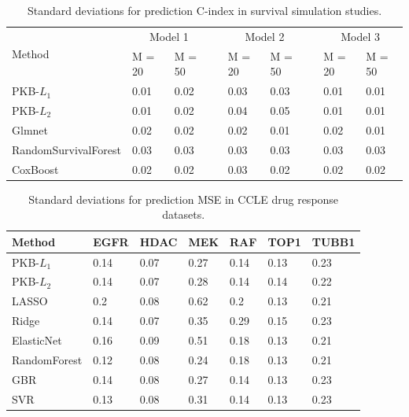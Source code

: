 \documentclass[a4paper,12pt]{article}
\begin{document}
\begin{table}[htp]
	\centering
	\begin{tabular}{lllllllll}
		\hline
		\multirow{2}{*}{Method} & \multicolumn{2}{c}{Model 1} & \multicolumn{1}{c}{} & \multicolumn{2}{c}{Model 2} & \multicolumn{1}{c}{} & \multicolumn{2}{c}{Model 3} \\ \cline{2-3} \cline{5-6} \cline{8-9} 
		& M = 20       & M = 50       &                      & M = 20       & M = 50       &                      & M = 20       & M = 50       \\ \hline
		PKB-$L_1$                  & 0.01         & 0.02         &                      & 0.03         & 0.03         &                      & 0.01         & 0.01         \\
		PKB-$L_2$                  & 0.01         & 0.02         &                      & 0.04         & 0.05         &                      & 0.01         & 0.01         \\
		Glmnet                  & 0.02         & 0.02         &                      & 0.02         & 0.01         &                      & 0.02         & 0.01         \\
		RandomSurvivalForest    & 0.03         & 0.03         &                      & 0.03         & 0.03         &                      & 0.03         & 0.03         \\
		CoxBoost                & 0.02         & 0.02         &                      & 0.03         & 0.02         &                      & 0.02         & 0.02         \\ \hline
	\end{tabular}
	\caption{Standard deviations for prediction C-index in survival simulation studies.}
\end{table}

\newpage

\begin{table}[htp]
	\centering
	\begin{tabular}{lllllll}
		\hline
		Method       & EGFR & HDAC & MEK  & RAF  & TOP1 & TUBB1 \\ \hline
		PKB-$L_1$       & 0.14 & 0.07 & 0.27 & 0.14 & 0.13 & 0.23  \\
		PKB-$L_2$       & 0.14 & 0.07 & 0.28 & 0.14 & 0.14 & 0.22  \\
		LASSO        & 0.2  & 0.08 & 0.62 & 0.2  & 0.13 & 0.21  \\
		Ridge        & 0.14 & 0.07 & 0.35 & 0.29 & 0.15 & 0.23  \\
		ElasticNet   & 0.16 & 0.09 & 0.51 & 0.18 & 0.13 & 0.21  \\
		RandomForest & 0.12 & 0.08 & 0.24 & 0.18 & 0.13 & 0.21  \\
		GBR          & 0.14 & 0.08 & 0.27 & 0.14 & 0.13 & 0.23  \\
		SVR          & 0.13 & 0.08 & 0.31 & 0.14 & 0.13 & 0.23  \\ \hline
	\end{tabular}
	\caption{Standard deviations for prediction MSE in CCLE drug response datasets.}
\end{table}
\end{document}
